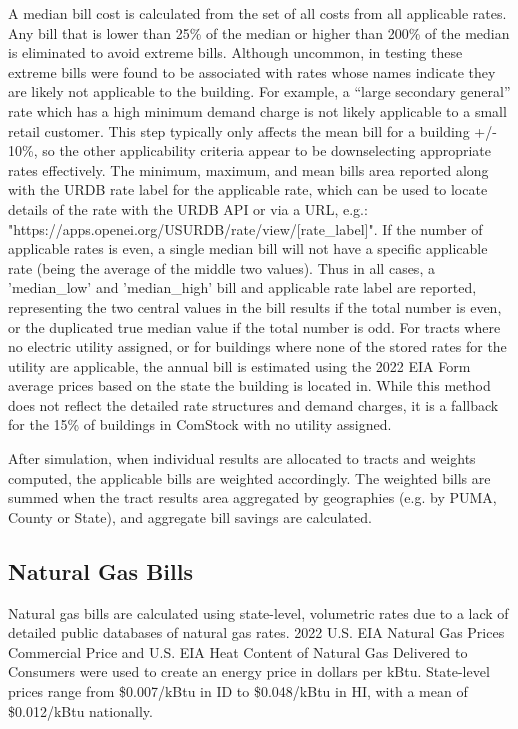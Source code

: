 A median bill cost is calculated from the set of all costs from all applicable rates. Any bill that is lower than 25\% of the median or higher than 200\% of the median is eliminated to avoid extreme bills. Although uncommon, in testing these extreme bills were found to be associated with rates whose names indicate they are likely not applicable to the building. For example, a ``large secondary general'' rate which has a high minimum demand charge is not likely applicable to a small retail customer. This step typically only affects the mean bill for a building +/- 10\%, so the other applicability criteria appear to be downselecting appropriate rates effectively. The minimum, maximum, and mean bills area reported along with the URDB rate label for the applicable rate, which can be used to locate details of the rate with the URDB API or via a URL, e.g.: "https://apps.openei.org/USURDB/rate/view/[rate\_label]". If the number of applicable rates is even, a single median bill will not have a specific applicable rate (being the average of the middle two values). Thus in all cases, a 'median\_low' and 'median\_high' bill and applicable rate label are reported, representing the two central values in the bill results if the total number is even, or the duplicated true median value if the total number is odd.
For tracts where no electric utility assigned, or for buildings where none of the stored rates for the utility are applicable, the annual bill is estimated using the 2022 EIA Form \citep{eia_electricity} average prices based on the state the building is located in. While this method does not reflect the detailed rate structures and demand charges, it is a fallback for the 15\% of buildings in ComStock with no utility assigned.

After simulation, when individual results are allocated to tracts and weights computed, the applicable bills are weighted accordingly. The weighted bills are summed when the tract results area aggregated by geographies (e.g. by PUMA, County or State), and aggregate bill savings are calculated. 

\subsection{Natural Gas Bills}
Natural gas bills are calculated using state-level, volumetric rates due to a lack of detailed public databases of natural gas rates. 2022 U.S. EIA Natural Gas Prices \- Commercial Price and U.S. EIA Heat Content of Natural Gas Delivered to Consumers \citep{eia_natural_gas} were used to create an energy price in dollars per kBtu. State-level prices range from \$0.007/kBtu in ID to \$0.048/kBtu in HI, with a mean of \$0.012/kBtu nationally.

